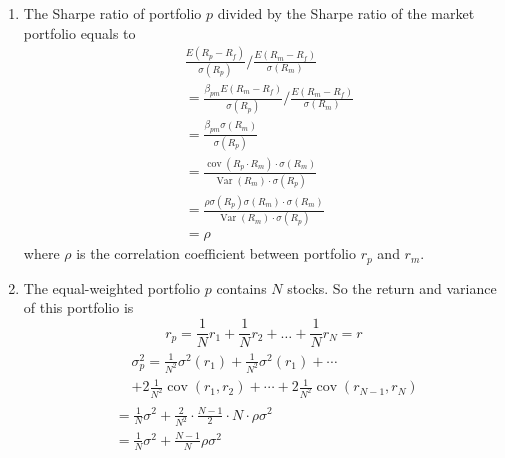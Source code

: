 \documentclass[11pt,green,twocol,citestyle=authoryear, bibstyle=authoryear]{elegantbook}
\begin{document}
\begin{solution}
\begin{enumerate}
    \item The Sharpe ratio of portfolio $ p $ divided by the Sharpe ratio of the market portfolio equals to
    \begin{equation*}
        \begin{aligned}
            &\frac{E\left(R_p-R_f\right)}{\sigma\left(R_p\right)} / \frac{E\left(R_m-R_f\right)}{\sigma\left(R_m\right)} \\
            &=\frac{\beta_{p m} E\left(R_m-R_f\right)}{\sigma\left(R_p\right)} / \frac{E\left(R_m-R_f\right)}{\sigma\left(R_m\right)} \\
            &=\frac{\beta_{p m} \sigma\left(R_m\right)}{\sigma\left(R_p\right)} \\
            &=\frac{\operatorname{cov}\left(R_p \cdot R_m\right) \cdot \sigma\left(R_m\right)}{\operatorname{Var}\left(R_m\right) \cdot \sigma\left(R_p\right)} \\
            &=\frac{\rho \sigma\left(R_p\right) \sigma\left(R_m\right) \cdot \sigma\left(R_m\right)}{\operatorname{Var}\left(R_m\right) \cdot \sigma\left(R_p\right)}\\
            &=\rho
        \end{aligned}
    \end{equation*}
    where $ \rho $ is the correlation coefficient between portfolio $ r_p $ and $ r_m $.   
    \item The equal-weighted portfolio $ p $  contains $ N $ stocks. So the return and variance of this portfolio is 
    \begin{equation*}
        r_p=\frac{1}{N} r_1+\frac{1}{N} r_2+\ldots+\frac{1}{N} r_N=r
    \end{equation*}  
    \begin{equation*}
        \begin{aligned}
            &\begin{aligned}
            &\sigma_p^2=\frac{1}{N^2} \sigma^2\left(r_1\right)+\frac{1}{N^2}\sigma^2\left(r_1\right)+\cdots \\
            & + 2\frac{1}{N^2} \operatorname{cov}\left(r_1, r_2\right)+\cdots+2 \frac{1}{N^2} \operatorname{cov}\left(r_{N-1}, r_N\right)
            \end{aligned}\\
            &=\frac{1}{N} \sigma^2+\frac{2}{N^2} \cdot \frac{N-1}{2} \cdot N \cdot \rho \sigma^2\\
            &=\frac{1}{N} \sigma^2+\frac{N-1}{N} \rho \sigma^2\\

\end{aligned}
\end{equation*}
\end{enumerate}
\end{solution}
\end{document}
